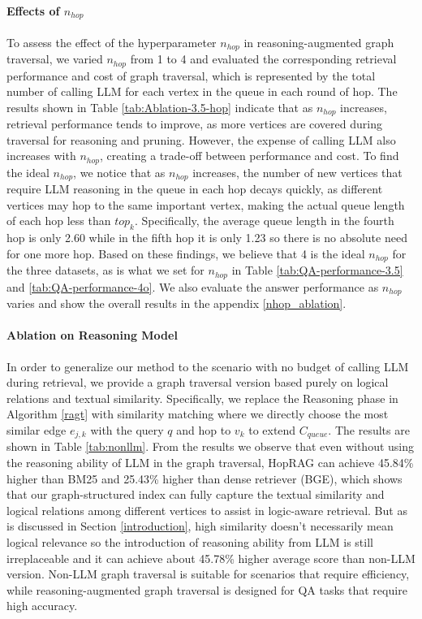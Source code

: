 \paragraph{Effects of $n_{hop}$} To assess the effect of the hyperparameter $n_{hop}$ in reasoning-augmented graph traversal, we varied $n_{hop}$ from 1 to 4 and evaluated the corresponding retrieval performance and cost of graph traversal, which is represented by the total number of calling LLM for each vertex in the queue in each round of hop. The results shown in Table \ref{tab:Ablation-3.5-hop} indicate that as $n_{hop}$ increases, retrieval performance tends to improve, as more vertices are covered during traversal for reasoning and pruning. However, the expense of calling LLM also increases with $n_{hop}$, creating a trade-off between performance and cost. To find the ideal $n_{hop}$, we notice that as $n_{hop}$ increases, the number of new vertices that require LLM reasoning in the queue in each hop decays quickly, as different vertices may hop to the same important vertex, making the actual queue length of each hop less than $top_k$. Specifically, the average queue length in the fourth hop is only 2.60 while in the fifth hop it is only 1.23 so there is no absolute need for one more hop. Based on these findings, we believe that 4 is the ideal $n_{hop}$ for the three datasets, as is what we set for $n_{hop}$ in Table \ref{tab:QA-performance-3.5} and \ref{tab:QA-performance-4o}. We also evaluate the answer performance as $n_{hop}$ varies and show the overall results in the appendix \ref{nhop_ablation}.

\paragraph{Ablation on Reasoning Model} 
In order to generalize our method to the scenario with no budget of calling LLM during retrieval, we provide a graph traversal version based purely on logical relations and textual similarity. Specifically, we replace the Reasoning phase in Algorithm \ref{ragt} with similarity matching where we directly choose the most similar edge ${e_{j,k}}$   with the query $q$ %
and hop to $v_k$ to extend $C_{queue}$. The results are shown in Table \ref{tab:nonllm}. From the results we observe that even without using the reasoning ability of LLM in the graph traversal, HopRAG can achieve 45.84\% higher than BM25 and 25.43\% higher than dense retriever (BGE), which shows that our graph-structured index can fully capture the textual similarity and logical relations among different vertices to assist in logic-aware retrieval. But as is discussed in Section \ref{introduction}, high similarity doesn't necessarily mean logical relevance so the introduction of reasoning ability from LLM is still irreplaceable and it can achieve about 45.78\% higher average score than non-LLM version. Non-LLM graph traversal is suitable for scenarios that require efficiency, while reasoning-augmented graph traversal is designed for QA tasks that require high accuracy. 

